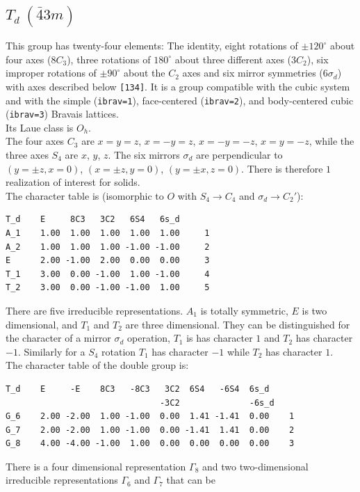 \documentclass[12pt,a4paper]{article}
\begin{document}
\newpage
\subsection{\color{web-blue}$T_d\ (\bar 43m)$}
This group has twenty-four elements: The identity, eight rotations 
of $\pm120^\circ$ about four axes ($8C_3$), three rotations of 
$180^\circ$ about three different axes ($3C_2$), six
improper rotations of $\pm90^\circ$ about the $C_2$ axes and
six mirror symmetries ($6\sigma_d$) with axes described below \texttt{[134]}.
It is a group compatible with the cubic system and with the  
simple (\texttt{ibrav=1}), face-centered (\texttt{ibrav=2}), 
and body-centered cubic (\texttt{ibrav=3}) Bravais lattices. \\
Its Laue class is $O_{h}$. \\
The four axes $C_3$ are $x=y=z$, $x=-y=z$, $x=-y=-z$, $x=y=-z$, while
the three axes $S_4$ are $x$, $y$, $z$. 
The six mirrors $\sigma_d$ are perpendicular to $(y=\pm z, x=0)$,
$(x=\pm z, y=0)$, $(y=\pm x, z=0)$.
There is therefore $1$ realization of interest for solids. \\
The character table is (isomorphic to $O$ with $S_4 \rightarrow C_4$ and
$\sigma_d \rightarrow C_2'$):
\begin{verbatim}
T_d    E     8C3   3C2   6S4   6s_d
A_1    1.00  1.00  1.00  1.00  1.00     1
A_2    1.00  1.00  1.00 -1.00 -1.00     2
E      2.00 -1.00  2.00  0.00  0.00     3
T_1    3.00  0.00 -1.00  1.00 -1.00     4
T_2    3.00  0.00 -1.00 -1.00  1.00     5
\end{verbatim}
There are five irreducible representations. $A_1$ is totally symmetric,
$E$ is two dimensional, and $T_1$ and $T_2$ are three dimensional.
They can be distinguished for the character of a mirror $\sigma_d$ operation,
$T_1$ is has character $1$ and $T_2$ has character $-1$. 
Similarly for a $S_4$ rotation $T_1$ has character $-1$ 
while $T_2$ has character $1$. \\
The character table of the double group is:
\begin{verbatim}
T_d    E     -E    8C3   -8C3   3C2  6S4   -6S4  6s_d 
                               -3C2              -6s_d
G_6    2.00 -2.00  1.00 -1.00  0.00  1.41 -1.41  0.00    1
G_7    2.00 -2.00  1.00 -1.00  0.00 -1.41  1.41  0.00    2
G_8    4.00 -4.00 -1.00  1.00  0.00  0.00  0.00  0.00    3
\end{verbatim}
There is a four dimensional representation $\Gamma_8$ and two two-dimensional 
irreducible representations $\Gamma_6$ and $\Gamma_7$ that can be
\end{document}
